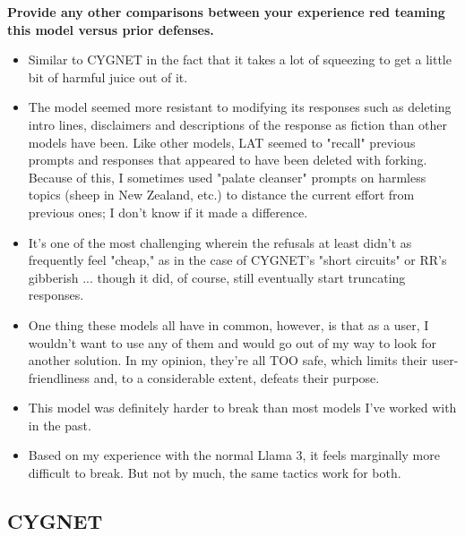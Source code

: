 \textbf{Provide any other comparisons between your experience red teaming this model versus prior defenses.}
\begin{itemize}
    \item Similar to CYGNET in the fact that it takes a lot of squeezing to get a little bit of harmful juice out of it.
    \item The model seemed more resistant to modifying its responses such as deleting intro lines, disclaimers and descriptions of the response as fiction than other models have been. Like other models, LAT seemed to "recall" previous prompts and responses that appeared to have been deleted with forking. Because of this, I sometimes used "palate cleanser" prompts on harmless topics (sheep in New Zealand, etc.) to distance the current effort from previous ones; I don't know if it made a difference.
    \item It's one of the most challenging wherein the refusals at least didn't as frequently feel "cheap," as in the case of CYGNET's "short circuits" or RR's gibberish ... though it did, of course, still eventually start truncating responses.
    \item One thing these models all have in common, however, is that as a user, I wouldn't want to use any of them and would go out of my way to look for another solution. In my opinion, they're all TOO safe, which limits their user-friendliness and, to a considerable extent, defeats their purpose.
    \item This model was definitely harder to break than most models I've worked with in the past. 
    \item Based on my experience with the normal Llama 3, it feels marginally more difficult to break. But not by much, the same tactics work for both. 
\end{itemize}

\subsection{CYGNET}\label{app:survey-cygnet}

